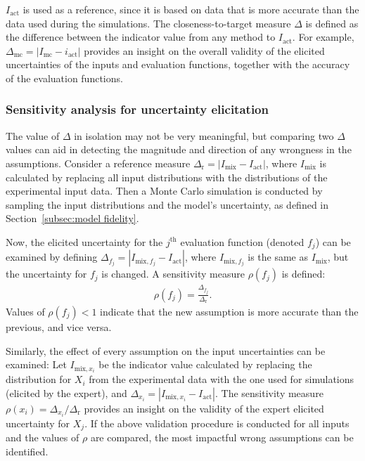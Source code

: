 \documentclass[a4paper]{article}
\newcommand{\brr}[1]{{\left({#1}\right)}} %
\newcommand{\brabs}[1]{\left\vert{#1}\right\vert} %
\begin{document}
$I_\text{act}$ is used as a reference, since it is based on data that is more accurate than the data used during the simulations. The closeness-to-target measure $\Delta$ is defined as the difference between the indicator value from any method to $I_\text{act}$. For example, $\Delta_\text{mc} = \brabs{I_\text{mc}-i_\text{act}}$ provides an insight on the overall validity of the elicited uncertainties of the inputs and evaluation functions, together with the accuracy of the evaluation functions.

\subsubsection{Sensitivity analysis for uncertainty elicitation}
\label{subsubsec:sensitivity}
The value of $\Delta$ in isolation may not be very meaningful, but comparing two $\Delta$ values can aid in detecting the magnitude and direction of any wrongness in the assumptions.
Consider a reference measure $\Delta_\text{r} = \brabs{I_\text{mix}-I_\text{act}}$, where $I_\text{mix}$ is calculated by replacing all input distributions with the distributions of the experimental input data. Then a Monte Carlo simulation is conducted by sampling the input distributions and the model's uncertainty, as defined in Section~\ref{subsec:model fidelity}.

Now, the elicited uncertainty for the $j^\text{th}$ evaluation function (denoted $f_j$) can be examined by defining  $\Delta_{f_j} = \brabs{I_{\text{mix},f_j}-I_\text{act}}$, where $I_{\text{mix},f_j}$ is the same as $I_\text{mix}$, but the uncertainty for $f_j$ is changed. A sensitivity measure $\rho\brr{f_j}$ is defined:
\begin{align}
	\rho\brr{f_j} = \frac{\Delta_{f_j}}{\Delta_\text{r}}.
\end{align}
Values of $\rho\brr{f_j} < 1$ indicate that the new assumption is more accurate than the previous, and vice versa.

Similarly, the effect of every assumption on the input uncertainties can be examined: Let $I_{\text{mix},x_i}$ be the indicator value calculated by replacing the distribution for $X_i$ from the experimental data with the one used for simulations (elicited by the expert), and $\Delta_{x_i} = \brabs{I_{\text{mix},x_i}-I_\text{act}}$. The sensitivity measure $\rho\brr{x_i} = \Delta_{x_i} / \Delta_\text{r}$ provides an insight on the validity of the expert elicited uncertainty for $X_j$.
If the above validation procedure is conducted for all inputs and the values of $\rho$ are compared, the most impactful wrong assumptions can be identified.
\end{document}
